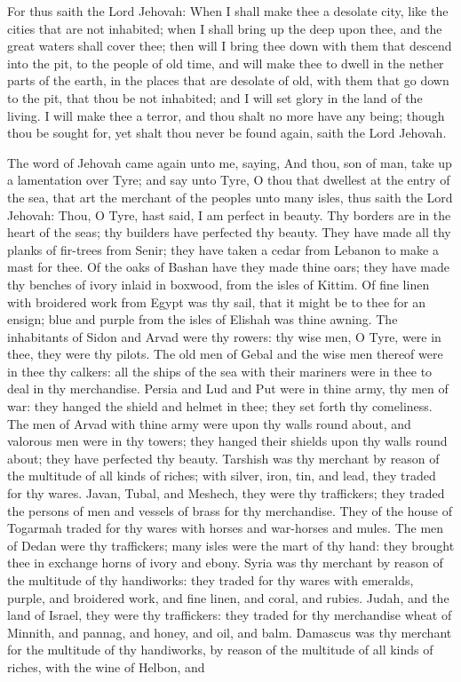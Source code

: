  For thus saith the Lord Jehovah: When I shall make thee a desolate city, like the cities that are not inhabited; when I shall bring up the deep upon thee, and the great waters shall cover thee; then will I bring thee down with them that descend into the pit, to the people of old time, and will make thee to dwell in the nether parts of the earth, in the places that are desolate of old, with them that go down to the pit, that thou be not inhabited; and I will set glory in the land of the living. I will make thee a terror, and thou shalt no more have any being; though thou be sought for, yet shalt thou never be found again, saith the Lord Jehovah. 

The word of Jehovah came again unto me, saying, And thou, son of man, take up a lamentation over Tyre; and say unto Tyre, O thou that dwellest at the entry of the sea, that art the merchant of the peoples unto many isles, thus saith the Lord Jehovah: Thou, O Tyre, hast said, I am perfect in beauty. Thy borders are in the heart of the seas; thy builders have perfected thy beauty. They have made all thy planks of fir-trees from Senir; they have taken a cedar from Lebanon to make a mast for thee. Of the oaks of Bashan have they made thine oars; they have made thy benches of ivory inlaid in boxwood, from the isles of Kittim. Of fine linen with broidered work from Egypt was thy sail, that it might be to thee for an ensign; blue and purple from the isles of Elishah was thine awning. The inhabitants of Sidon and Arvad were thy rowers: thy wise men, O Tyre, were in thee, they were thy pilots. The old men of Gebal and the wise men thereof were in thee thy calkers: all the ships of the sea with their mariners were in thee to deal in thy merchandise. Persia and Lud and Put were in thine army, thy men of war: they hanged the shield and helmet in thee; they set forth thy comeliness. The men of Arvad with thine army were upon thy walls round about, and valorous men were in thy towers; they hanged their shields upon thy walls round about; they have perfected thy beauty.  Tarshish was thy merchant by reason of the multitude of all kinds of riches; with silver, iron, tin, and lead, they traded for thy wares. Javan, Tubal, and Meshech, they were thy traffickers; they traded the persons of men and vessels of brass for thy merchandise. They of the house of Togarmah traded for thy wares with horses and war-horses and mules. The men of Dedan were thy traffickers; many isles were the mart of thy hand: they brought thee in exchange horns of ivory and ebony. Syria was thy merchant by reason of the multitude of thy handiworks: they traded for thy wares with emeralds, purple, and broidered work, and fine linen, and coral, and rubies. Judah, and the land of Israel, they were thy traffickers: they traded for thy merchandise wheat of Minnith, and pannag, and honey, and oil, and balm. Damascus was thy merchant for the multitude of thy handiworks, by reason of the multitude of all kinds of riches, with the wine of Helbon, and 
